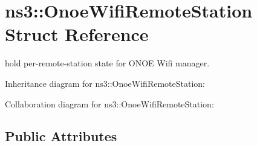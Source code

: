 \hypertarget{structns3_1_1OnoeWifiRemoteStation}{}\section{ns3\+:\+:Onoe\+Wifi\+Remote\+Station Struct Reference}
\label{structns3_1_1OnoeWifiRemoteStation}


hold per-\/remote-\/station state for O\+N\+OE Wifi manager.  




Inheritance diagram for ns3\+:\+:Onoe\+Wifi\+Remote\+Station\+:


Collaboration diagram for ns3\+:\+:Onoe\+Wifi\+Remote\+Station\+:
\subsection*{Public Attributes}
